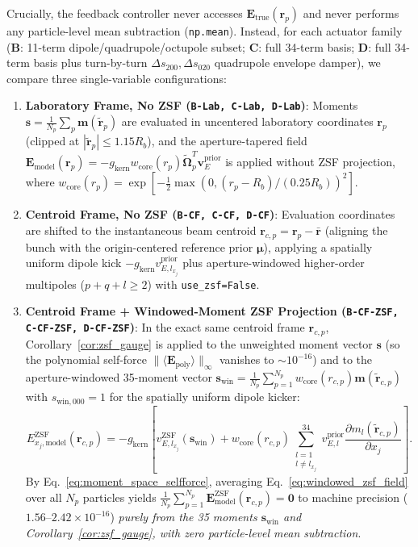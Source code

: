 \documentclass[11pt,a4paper]{article}
\newcommand{\bOmega}{\mathbf{\Omega}}
\begin{document}
Crucially, the feedback controller never accesses $\bm{E}_{\mathrm{true}}(\bm{r}_p)$ and never performs any particle-level mean subtraction (\texttt{np.mean}). Instead, for each actuator family (\textbf{B}: 11-term dipole/quadrupole/octupole subset; \textbf{C}: full 34-term basis; \textbf{D}: full 34-term basis plus turn-by-turn $\Delta s_{200}, \Delta s_{020}$ quadrupole envelope damper), we compare three single-variable configurations:
\begin{enumerate}
    \item \textbf{Laboratory Frame, No ZSF (\texttt{B-Lab, C-Lab, D-Lab})}: Moments $\bm{s} = \frac{1}{N_p}\sum_p \bm{m}(\tilde{\bm{r}}_p)$ are evaluated in uncentered laboratory coordinates $\bm{r}_p$ (clipped at $|\tilde{\bm{r}}_p| \le 1.15 R_b$), and the aperture-tapered field $\bm{E}_{\mathrm{model}}(\bm{r}_p) = -g_{\mathrm{kern}} w_{\mathrm{core}}(r_p)\tilde{\bOmega}_p^T \bm{v}_E^{\mathrm{prior}}$ is applied without ZSF projection, where $w_{\mathrm{core}}(r_p) = \exp[-\frac{1}{2}\max(0, (r_p - R_b)/(0.25 R_b))^2]$.
    \item \textbf{Centroid Frame, No ZSF (\texttt{B-CF, C-CF, D-CF})}: Evaluation coordinates are shifted to the instantaneous beam centroid $\bm{r}_{c,p} = \bm{r}_p - \bar{\bm{r}}$ (aligning the bunch with the origin-centered reference prior $\bm{\mu}$), applying a spatially uniform dipole kick $-g_{\mathrm{kern}} v_{E,l_{x_j}}^{\mathrm{prior}}$ plus aperture-windowed higher-order multipoles ($p+q+l \ge 2$) with \texttt{use\_zsf=False}.
    \item \textbf{Centroid Frame + Windowed-Moment ZSF Projection (\texttt{B-CF-ZSF, C-CF-ZSF, D-CF-ZSF})}: In the exact same centroid frame $\bm{r}_{c,p}$, Corollary~\ref{cor:zsf_gauge} is applied to the unweighted moment vector $\bm{s}$ (so the polynomial self-force $\|\langle \bm{E}_{\mathrm{poly}}\rangle\|_\infty$ vanishes to $\sim 10^{-16}$) and to the aperture-windowed 35-moment vector $\bm{s}_{\mathrm{win}} = \frac{1}{N_p}\sum_{p=1}^{N_p} w_{\mathrm{core}}(r_{c,p})\bm{m}(\tilde{\bm{r}}_{c,p})$ with $s_{\mathrm{win},000} = 1$ for the spatially uniform dipole kicker:
    \begin{equation}
        E_{x_j,\mathrm{model}}^{\mathrm{ZSF}}(\bm{r}_{c,p}) = -g_{\mathrm{kern}} \left[ v_{E,l_{x_j}}^{\mathrm{ZSF}}(\bm{s}_{\mathrm{win}}) + w_{\mathrm{core}}(r_{c,p}) \sum_{\substack{l=1 \\ l \ne l_{x_j}}}^{34} v_{E,l}^{\mathrm{prior}} \frac{\partial m_l(\tilde{\bm{r}}_{c,p})}{\partial x_j} \right].
        \label{eq:windowed_zsf_field}
    \end{equation}
    By Eq.~\eqref{eq:moment_space_selfforce}, averaging Eq.~\eqref{eq:windowed_zsf_field} over all $N_p$ particles yields $\frac{1}{N_p}\sum_{p=1}^{N_p} \bm{E}_{\mathrm{model}}^{\mathrm{ZSF}}(\bm{r}_{c,p}) = \bm{0}$ to machine precision ($1.56\text{--}2.42 \times 10^{-16}$) \emph{purely from the 35 moments $\bm{s}_{\mathrm{win}}$ and Corollary~\ref{cor:zsf_gauge}, with zero particle-level mean subtraction}.
\end{enumerate}
\end{document}
